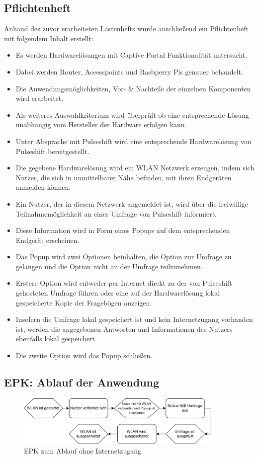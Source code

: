 \subsection{Pflichtenheft}
Anhand des zuvor erarbeiteten Lastenhefts wurde anschließend ein Pflichtenheft mit folgendem Inhalt erstellt:
\begin{itemize}
\item Es werden Hardwarelösungen mit Captive Portal Funktionalität untersucht.
\item Dabei werden Router, Accesspoints und Rasbperry Pis genauer behandelt.
\item Die Anwendungsmöglichkeiten, Vor- \& Nachteile der einzelnen Komponenten wird erarbeitet.
\item Als weiteres Auswahlkriterium wird überprüft ob eine entsprechende Lösung unabhängig vom Hersteller der Hardware erfolgen kann.
\item Unter Absprache mit Pulseshift wird eine entsprechende Hardwarelösung von Pulseshift bereitgestellt.
\item Die gegebene Hardwarelösung wird ein WLAN Netzwerk erzeugen, indem sich Nutzer, die sich in unmittelbarer Nähe befinden, mit ihren Endgeräten anmelden können.
\item Ein Nutzer, der in diesem Netzwerk angemeldet ist, wird über die freiwillige Teilnahmemöglichkeit an einer Umfrage von Pulseshift informiert.
\item Diese Information wird in Form eines Popups auf dem entsprechenden Endgerät erscheinen.
\item Das Popup wird zwei Optionen beinhalten, die Option zur Umfrage zu gelangen und die Option nicht an der Umfrage teilzunehmen.
\item Erstere Option wird entweder per Internet direkt zu der von Pulseshift gehosteten Umfrage führen oder eine auf der Hardwarelösung lokal gespeicherte Kopie der Fragebögen anzeigen.
\item Insofern die Umfrage lokal gespeichert ist und kein Internetzugang vorhanden ist, werden die angegebenen Antworten und Informationen des Nutzers ebenfalls lokal gespeichert.
\item Die zweite Option wird das Popup schließen.
\end{itemize}

\subsection{EPK: Ablauf der Anwendung}
\begin{figure}[H]
\centering
\includegraphics[width=0.9\textwidth]{images/captiveportal_EPK1}
\caption[EPK zum Ablauf ohne Internetzugang]{EPK zum Ablauf ohne Internetzugang}
\end{figure}

